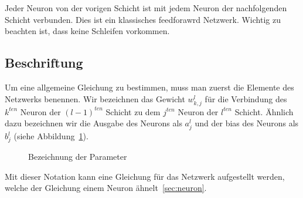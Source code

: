\documentclass[12pt,a4paper]{report}
\begin{document}
Jeder Neuron von der vorigen Schicht ist mit jedem Neuron der nachfolgenden Schicht verbunden.
Dies ist ein klassisches feedforawrd Netzwerk.
Wichtig zu beachten ist, dass keine Schleifen vorkommen.

\subsection{Beschriftung}

Um eine allgemeine Gleichung zu bestimmen, muss man zuerst die Elemente des Netzwerks benennen.
Wir bezeichnen das Gewicht $w^l_{k,j}$ für die Verbindung des $k^{ten}$ Neuron der $(l-1)^{ten}$ Schicht
zu dem $j^{ten}$ Neuron der $l^{ten}$ Schicht.
Ähnlich dazu bezeichnen wir die Ausgabe des Neurons als $a^l_j$ und der bias des Neurons als $b^l_j$ (siehe Abbildung~\ref{fig:network3}).

\begin{figure}[h]
    \centering
{}
    \caption{Bezeichnung der Parameter}
    \label{fig:network3}
\end{figure}
Mit dieser Notation kann eine Gleichung für das Netzwerk aufgestellt werden, welche der Gleichung einem Neuron ähnelt~\ref{sec:neuron}.
\end{document}
